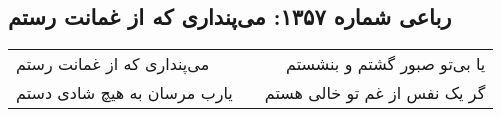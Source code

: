 \begin{center}
\section*{رباعی شماره ۱۳۵۷: می‌پنداری که از غمانت رستم}
\label{sec:1357}
\begin{longtable}{l p{0.5cm} r}
می‌پنداری که از غمانت رستم
&&
یا بی‌تو صبور گشتم و بنشستم
\\
یارب مرسان به هیچ شادی دستم
&&
گر یک نفس از غم تو خالی هستم
\\
\end{longtable}
\end{center}
